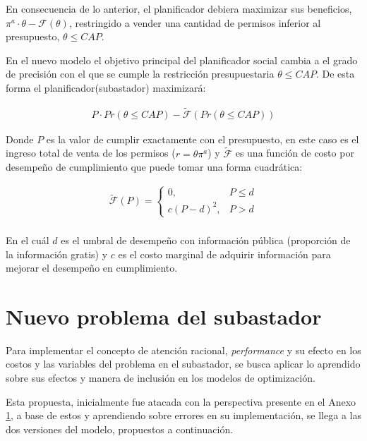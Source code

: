 En consecuencia de lo anterior, el planificador debiera maximizar sus beneficios, $\pi^a\cdot\theta-\mathcal{F}(\theta)$, restringido a vender una cantidad de permisos inferior al presupuesto, $\theta\leq CAP$.
\vspace{2.5mm}


En el nuevo modelo el objetivo principal del planificador social cambia a el grado de precisión con el que se cumple la restricción presupuestaria $\theta\leq CAP$. De esta forma el planificador(subastador) maximizará:

\begin{align}
P\cdot Pr(\theta\leq CAP)-\tilde{\mathcal{F}}(Pr(\theta\leq CAP)) \label{nuevafposible}    
\end{align}


Donde $P$ es la valor de cumplir exactamente con el presupuesto, en este caso es el ingreso total de venta de los permisos ($r = \theta \pi^a$) y $\tilde{\mathcal{F}}$ es una función de costo por desempeño de cumplimiento que puede tomar una forma cuadrática:

\begin{equation}
\begin{array}{rrclcl}
    \tilde{\mathcal{F}}(P)=\begin{cases}0,&P\leq d\\c(P-d)^2,&P>d\end{cases}\label{costoperformace}\\
\end{array}
\end{equation}

En el cuál $d$ es el umbral de desempeño con información pública (proporción de la información gratis) y $c$ es el costo marginal de adquirir información para mejorar el desempeño en cumplimiento.
\vspace{2.5mm}


\section{Nuevo problema del subastador}

 Para implementar el concepto de atención racional, \textit{performance} y su efecto en los costos y las variables del problema en el subastador, se busca aplicar lo aprendido sobre sus efectos y manera de inclusión en los modelos de optimización.
\vspace{2.5mm} 

Esta propuesta, inicialmente fue atacada con la perspectiva presente en el Anexo \ref{}, a base de estos y aprendiendo sobre errores en su implementación, se llega a las dos versiones del modelo, propuestos a continuación.

